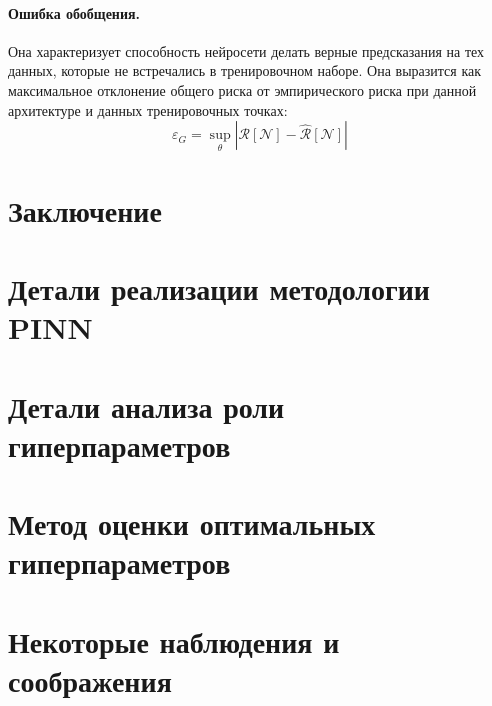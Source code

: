 \documentclass[a4paper, 12pt]{article}
\begin{document}
\paragraph{Ошибка обобщения.} Она характеризует способность нейросети делать верные предсказания на тех данных, которые не встречались в тренировочном наборе. Она выразится как максимальное отклонение общего риска от эмпирического риска при данной архитектуре и данных тренировочных точках:
$$
\varepsilon_G = \sup_{\theta}|\mathcal{R}[\mathcal{N}] - \hat{\mathcal{R}}[\mathcal{N}]|
$$

\section*{Заключение} \label{section:conclusion}

\printbibliography[heading=bibintoc,title={Список источников}]

\appendix

\section{Детали реализации методологии PINN} \label{section:appendix:pinn}

\section{Детали анализа роли гиперпараметров} \label{section:appendix:hyperparameters}

\section{Метод оценки оптимальных гиперпараметров} \label{section:appendix:hpo}

\section{Некоторые наблюдения и соображения} \label{section:appendix:thoughts}
\end{document}

